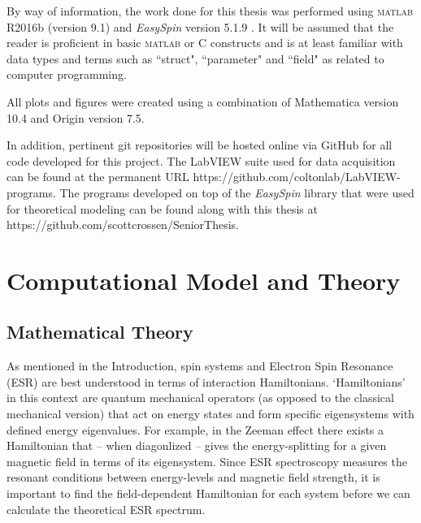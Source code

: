 \documentclass[oneside, astronomy, noacknowlegments]{BYUPhys}
\begin{document}
By way of information, the work done for this thesis was performed using \textsc{matlab} R2016b (version 9.1) and \textit{EasySpin} version 5.1.9 . It will be assumed that the reader is proficient in basic \textsc{matlab} or C constructs and is at least familiar with data types and terms such as ``struct", ``parameter" and ``field" as related to computer programming.

All plots and figures were created using a combination of Mathematica version 10.4 and Origin version 7.5.

In addition, pertinent git repositories will be hosted online via GitHub for all code developed for this project. The LabVIEW suite used for data acquisition can be found at the permanent URL https://github.com/coltonlab/LabVIEW-programs. The programs developed on top of the \textit{EasySpin} library that were used for theoretical modeling can be found along with this thesis at https://github.com/scottcrossen/SeniorThesis.










\chapter{Computational Model and Theory}

\section{Mathematical Theory}

As mentioned in the Introduction, spin systems and Electron Spin Resonance (ESR) are best understood in terms of interaction Hamiltonians. `Hamiltonians' in this context are quantum mechanical operators (as opposed to the classical mechanical version) that act on energy states and form specific eigensystems with defined energy eigenvalues. For example, in the Zeeman effect there exists a Hamiltonian that -- when diagonlized -- gives the energy-splitting for a given magnetic field in terms of its eigensystem. Since ESR spectroscopy measures the resonant conditions between energy-levels and magnetic field strength, it is important to find the field-dependent Hamiltonian for each system before we can calculate the theoretical ESR spectrum.
\end{document}
